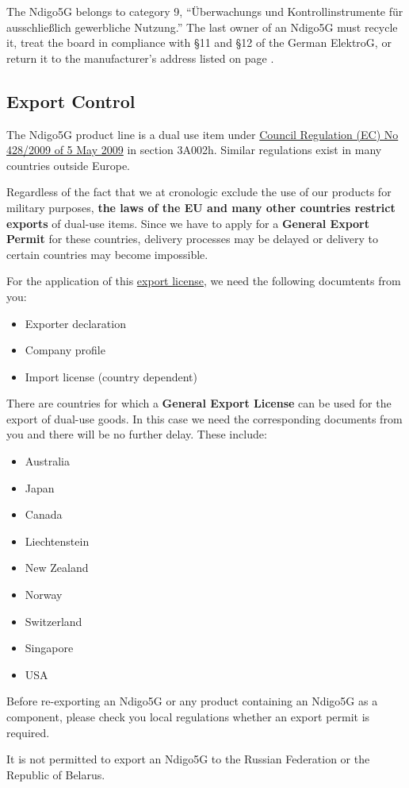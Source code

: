     The Ndigo5G belongs to category 9, ``Überwachungs und Kontrollinstrumente f\"u{}r aus\-schlie\ss lich gewerbliche Nutzung.'' The last owner of an Ndigo5G must recycle it, treat the board in compliance with \S{}11 and \S{}12 of the German ElektroG, or return it to the manufacturer's address listed on page \pageref{cp:manu}.

\subsection{Export Control}
The Ndigo5G product line is a dual use item under \href{https://eur-lex.europa.eu/eli/reg/2009/428/oj}{Council Regulation (EC) No 428/2009 of 5 May 2009} in section 3A002h. Similar regulations exist in many countries outside Europe.

Regardless of the fact that we at cronologic exclude the use of our products for military purposes, \textbf{the laws of the EU and many other countries restrict exports} of dual-use items. Since we have to apply for a \textbf{General Export Permit} for these countries, delivery processes may be delayed or delivery to certain countries may become impossible.

For the application of this \href{https://www.cronologic.de/faq/export-license}{export license}, we need the following
documtents from you:

\begin{itemize}
    \item Exporter declaration
    \item Company profile
    \item Import license (country dependent)
\end{itemize}

There are countries for which a \textbf{General Export License} can be used for the export of dual-use goods. In this case we need the corresponding documents from you and there will be no further delay. These include:
\begin{itemize}
    \item Australia
    \item Japan
    \item Canada
    \item Liechtenstein
    \item New Zealand
    \item Norway
    \item Switzerland
    \item Singapore
    \item USA
\end{itemize}

Before re-exporting an Ndigo5G or any product containing an Ndigo5G as a 
component, please check you local regulations whether an export permit is 
required.

It is not permitted to export an Ndigo5G to the Russian Federation or the 
Republic of Belarus.